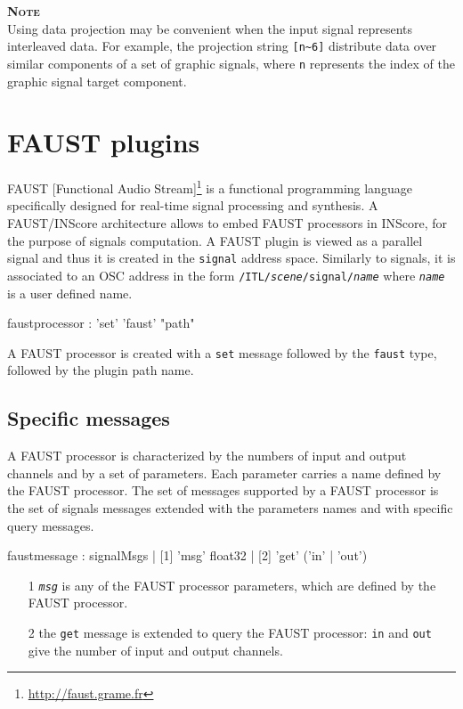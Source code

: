 \documentclass[a4paper,twoside]{report}
\newcommand{\toplevel}[1]	{\chapter{#1}}
\newcommand{\sublevel}[1]	{\section{#1}}
\newcommand{\OSC}[1]		{\texttt{#1}}
\newcommand{\note}	[1]		{\vspace{2mm}\textbf{\hspace{-1.03cm}\textbf{\textsc{Note #1}}}}
\begin{document}
\note{} \\
Using data projection may be convenient when the input signal represents interleaved data. For example, the projection string \OSC{[n\~{}6]} distribute data over similar components of a set of graphic signals, where \OSC{n} represents the index of the graphic signal target component.


\toplevel{FAUST plugins}
\label{faust}

FAUST [Functional Audio Stream]\footnote{\url{http://faust.grame.fr}} is a functional programming language specifically designed for real-time signal processing and synthesis. A FAUST/INScore architecture allows to embed FAUST processors in INScore, for the purpose of signals computation. A FAUST plugin is viewed as a parallel signal and thus it is created in the \OSC{signal} address space. Similarly to signals, it is associated to an OSC address in the form \OSC{/ITL/\emph{scene}/signal/\emph{name}} where \OSC{\emph{name}} is a user defined name.

\begin{rail}
faustprocessor : 'set' 'faust' "path"
\end{rail}
A FAUST processor is created with a \OSC{set} message followed by the \OSC{faust} type, followed by the plugin path name. 


\sublevel{Specific messages}
\label{faustmsg}
A FAUST processor is characterized by the numbers of input and output channels and by a set of parameters. Each parameter carries a name defined by the FAUST processor. The set of messages supported by a FAUST processor is the set of signals messages extended with the parameters names and with specific query messages. 

\begin{rail}
faustmessage : signalMsgs
			 | [1] 'msg' float32
			 | [2] 'get' ('in' | 'out')
\end{rail}

\begin{itemize}
\item [1] \OSC{\emph{msg}} is any of the FAUST processor parameters, which are defined by the FAUST processor.
\item [2] the \OSC{get} message is extended to query the FAUST processor: \OSC{in} and \OSC{out} give the number of input and output channels.
\end{itemize}
\end{document}
